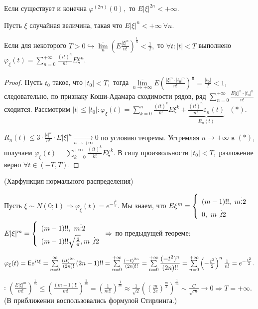 	\begin{property}[б/д]
		Если существует и конечна $\varphi^{(2n)}(0),$ то $E|\xi|^{2n} < +\infty.$
	\end{property}
	\begin{theorem}
		Пусть $\xi$ случайная величина, такая что $E|\xi|^n < +\infty~ \forall n.$ 
		
		Если для некоторого $T > 0 \hookrightarrow \overline{\lim\limits_{n}}\left(E \frac{|\xi|^n}{n!}\right)^\frac{1}{n} < \frac{1}{T},$ то $\forall t: |t| < T$ выполнено $\varphi_\xi(t) = \sum\limits_{n = 0}^{+\infty} \frac{(it)^n}{n!}E\xi^n.$
		\begin{proof}
			Пусть $t_0$ такое, что $|t_0| < T, $ тогда $\overline{\lim\limits_{n \to +\infty}}E\left(\frac{|\xi|^n \cdot |t_0|^n}{n!}\right)^{\frac{1}{n}} = \frac{|t_0|}{T} < 1, $ следовательно, по признаку Коши-Адамара сходимости рядов, ряд $\sum\limits_{n = 0}^{+\infty} \frac{E|\xi|^n\cdot|t_0|^n}{n!}$ сходится.
			Рассмотрим $|t| \leqslant |t_0|: \varphi_\xi(t) = \sum\limits_{k = 0}^{n} \frac{(it)^k}{k!}E\xi^k + \underbrace{\frac{(it)^n}{n!}\varepsilon_n(t)}_{R_n(t)}~~~(*).$ 

			\noindent$R_n(t) \leqslant 3\cdot \frac{|t|^n}{n!}\cdot E|\xi|^n \underset{n \to +\infty}{\longrightarrow} 0$ по условию теоремы. Устремляя $n\to + \infty$ в $(*)$, получаем $\varphi_\xi(t) = \sum\limits_{k = 0}^{+\infty} \frac{(it)^k}{k!}E\xi^k.$ В силу произвольности $|t_0| < T,$ разложение верно $\forall t \in (-T, T).$
		\end{proof}
	\end{theorem}

	\begin{example} (Харфункция нормального распределения)
	
		Пусть $\xi \sim N(0;1) \Rightarrow \varphi_\xi(t) = e^{- \frac{t^2}{2}}.$ Мы знаем, что $E\xi^m = \left\{
			\begin{array}{l}
			(m-1)!!, ~m \vdots 2\\
			0, ~m\not \vdots 2
			\end{array}
		\right.$
		$E|\xi|^m = \left\{
			\begin{array}{l}
			(m - 1)!!, ~m \vdots 2\\
			(m - 1)!!\sqrt{\frac{2}{\pi}}, m \not \vdots 2
			\end{array}
		\right. \Rightarrow$ по предыдущей теореме:
		
		$\varphi_\xi(t) = \mathsf{E} e^{it\xi} = \sum\limits_{n = 0}^{\infty} \frac{(it)^{2n}}{(2n)!}(2n - 1)!! = \sum\limits_{n = 0}^{+\infty} \frac{(-t)^{2n}}{(2n)!!} = \sum\limits_{n = 0}^{+\infty} \dfrac{(- t^2)^n}{(2n)!!} = \sum\limits_{n = 0}^{+\infty} \left(- \frac{t^2}{2}\right)^n \frac{1}{n!} = e^{-\frac{t^2}{2}}.$

		\underline{}: $\left(\frac{E|\xi|^m}{m!}\right)^{\frac{1}{m}} \leqslant \left(\frac{(m - 1)!!}{m!}\right)^{\frac{1}{m}} = \left(\frac{1}{m!!}\right)^{\frac{1}{m}} \approx \frac{1}{\sqrt{2}}\left(\left(\frac{m}{2e}\right)^{\frac{m}{2}}\right)^{\frac{1}{m}} \sim \frac{C}{\sqrt{m}} \to 0 \Rightarrow T = + \infty.$ (В приближении воспользовались формулой Стирлинга.)
	\end{example}

